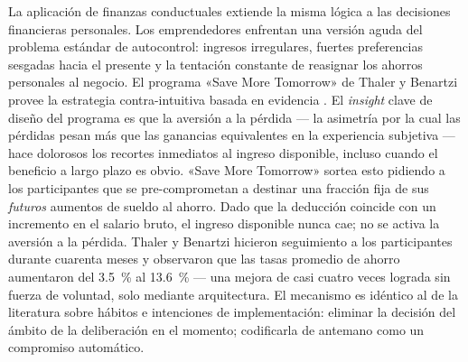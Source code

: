 La aplicación de finanzas conductuales extiende la misma lógica a las decisiones financieras
personales. Los emprendedores enfrentan una versión aguda del problema estándar de autocontrol:
ingresos irregulares, fuertes preferencias sesgadas hacia el presente y la tentación constante
de reasignar los ahorros personales al negocio. El programa «Save More Tomorrow» de Thaler y
Benartzi provee la estrategia contra-intuitiva basada en evidencia \parencite{thaler2004save}.
El \emph{insight} clave de diseño del programa es que la aversión a la pérdida --- la asimetría
por la cual las pérdidas pesan más que las ganancias equivalentes en la experiencia subjetiva ---
hace dolorosos los recortes inmediatos al ingreso disponible, incluso cuando el beneficio a largo
plazo es obvio. «Save More Tomorrow» sortea esto pidiendo a los participantes que se pre-comprometan
a destinar una fracción fija de sus \emph{futuros} aumentos de sueldo al ahorro. Dado que la
deducción coincide con un incremento en el salario bruto, el ingreso disponible nunca cae; no
se activa la aversión a la pérdida. Thaler y Benartzi hicieron seguimiento a los participantes
durante cuarenta meses y observaron que las tasas promedio de ahorro aumentaron del
\qty{3.5}{\percent} al \qty{13.6}{\percent} --- una mejora de casi cuatro veces lograda sin
fuerza de voluntad, solo mediante arquitectura. El mecanismo es idéntico al de la literatura
sobre hábitos e intenciones de implementación: eliminar la decisión del ámbito de la deliberación
en el momento; codificarla de antemano como un compromiso automático.

